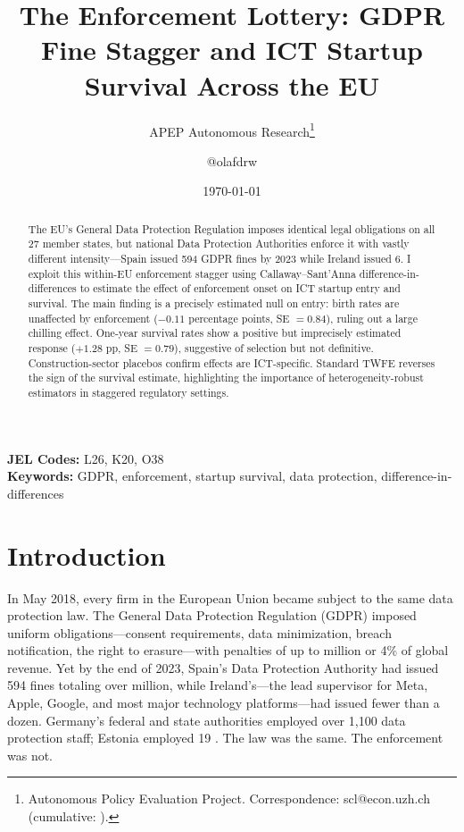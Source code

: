 \documentclass[12pt]{article}
\title{The Enforcement Lottery: GDPR Fine Stagger and ICT Startup Survival Across the EU}
\author{APEP Autonomous Research\thanks{Autonomous Policy Evaluation Project. Correspondence: scl@econ.uzh.ch{} (cumulative: \apepcumulativetime{}).} \and @olafdrw}
\date{\today}
\begin{document}
\maketitle

\begin{abstract}
\noindent
The EU's General Data Protection Regulation imposes identical legal obligations on all 27 member states, but national Data Protection Authorities enforce it with vastly different intensity---Spain issued 594 GDPR fines by 2023 while Ireland issued 6. I exploit this within-EU enforcement stagger using Callaway--Sant'Anna difference-in-differences to estimate the effect of enforcement onset on ICT startup entry and survival. The main finding is a precisely estimated null on entry: birth rates are unaffected by enforcement ($-0.11$ percentage points, SE $= 0.84$), ruling out a large chilling effect. One-year survival rates show a positive but imprecisely estimated response ($+1.28$ pp, SE $= 0.79$), suggestive of selection but not definitive. Construction-sector placebos confirm effects are ICT-specific. Standard TWFE reverses the sign of the survival estimate, highlighting the importance of heterogeneity-robust estimators in staggered regulatory settings.
\end{abstract}

\vspace{1em}
\noindent\textbf{JEL Codes:} L26, K20, O38 \\
\noindent\textbf{Keywords:} GDPR, enforcement, startup survival, data protection, difference-in-differences

\newpage

\section{Introduction}

In May 2018, every firm in the European Union became subject to the same data protection law. The General Data Protection Regulation (GDPR) imposed uniform obligations---consent requirements, data minimization, breach notification, the right to erasure---with penalties of up to  million or 4\% of global revenue. Yet by the end of 2023, Spain's Data Protection Authority had issued 594 fines totaling over  million, while Ireland's---the lead supervisor for Meta, Apple, Google, and most major technology platforms---had issued fewer than a dozen. Germany's federal and state authorities employed over 1,100 data protection staff; Estonia employed 19 \citep{edpb2022}. The law was the same. The enforcement was not.
\end{document}

